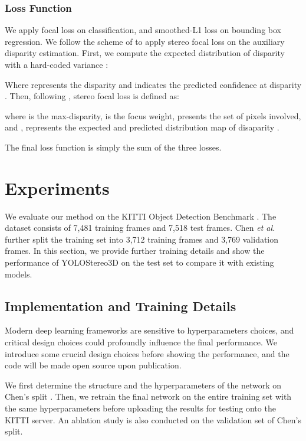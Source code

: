\documentclass[letterpaper, 10 pt, conference]{ieeeconf}
\begin{document}
\subsubsection{Loss Function}

We apply focal loss \cite{Yun2018Focal}\cite{Lin2018Focal} on classification, and smoothed-L1 loss \cite{Girshick2015Fastrcnn} on bounding box regression.  We follow the scheme of \cite{Zhang2019AcfNet} to apply stereo focal loss on the auxiliary disparity estimation.
First, we compute the expected distribution of disparity with a hard-coded variance :

Where  represents the disparity and  indicates the predicted confidence at disparity . Then, following \cite{Zhang2019AcfNet}, stereo focal loss is defined as:

where  is the max-disparity,  is the focus weight,  presents the set of pixels involved, and ,  represents the expected and predicted distribution map of disaparity .


The final loss function is simply the sum of the three losses.

 
\section{Experiments}
\label{section:Experiments}

We evaluate our method on the KITTI Object Detection Benchmark \cite{Geiger2012KITTI}.
The dataset consists of 7,481 training frames and 7,518 test frames.
Chen \textit{et al.} \cite{Chen2015kittisplit} further split the training set into 3,712 training frames and 3,769 validation frames. 
 In this section, we provide further training details and show the performance of YOLOStereo3D on the test set to compare it with existing models.
 \subsection{Implementation and Training Details}

 Modern deep learning frameworks are sensitive to hyperparameters choices, and critical design choices could profoundly influence the final performance.
 We introduce some crucial design choices before showing the performance, and the code will be made open source upon publication.

 We first determine the structure and the hyperparameters of the network on Chen's split \cite{Chen2015kittisplit}.
 Then, we retrain the final network on the entire training set with the same hyperparameters before uploading the results for testing onto the KITTI server. 
 An ablation study is also conducted on the validation set of Chen's split.
 
\end{document}
